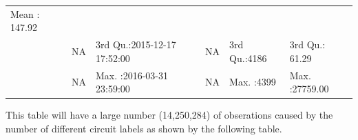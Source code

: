 \documentclass[]{article}
\begin{document}
\begin{longtable}[]{@{}llllll@{}}
\begin{minipage}[t]{0.15\columnwidth}
Mean : 147.92\strut
\end{minipage}\tabularnewline
\begin{minipage}[t]{0.03\columnwidth}\raggedright\strut
\strut
\end{minipage} & \begin{minipage}[t]{0.15\columnwidth}\raggedright\strut
NA\strut
\end{minipage} & \begin{minipage}[t]{0.24\columnwidth}\raggedright\strut
3rd Qu.:2015-12-17 17:52:00\strut
\end{minipage} & \begin{minipage}[t]{0.15\columnwidth}\raggedright\strut
NA\strut
\end{minipage} & \begin{minipage}[t]{0.12\columnwidth}\raggedright\strut
3rd Qu.:4186\strut
\end{minipage} & \begin{minipage}[t]{0.15\columnwidth}\raggedright\strut
3rd Qu.: 61.29\strut
\end{minipage}\tabularnewline
\begin{minipage}[t]{0.03\columnwidth}\raggedright\strut
\strut
\end{minipage} & \begin{minipage}[t]{0.15\columnwidth}\raggedright\strut
NA\strut
\end{minipage} & \begin{minipage}[t]{0.24\columnwidth}\raggedright\strut
Max. :2016-03-31 23:59:00\strut
\end{minipage} & \begin{minipage}[t]{0.15\columnwidth}\raggedright\strut
NA\strut
\end{minipage} & \begin{minipage}[t]{0.12\columnwidth}\raggedright\strut
Max. :4399\strut
\end{minipage} & \begin{minipage}[t]{0.15\columnwidth}\raggedright\strut
Max. :27759.00\strut
\end{minipage}\tabularnewline
\bottomrule
\end{longtable}

This table will have a large number (14,250,284) of obserations caused
by the number of different circuit labels as shown by the following
table.
\end{document}
